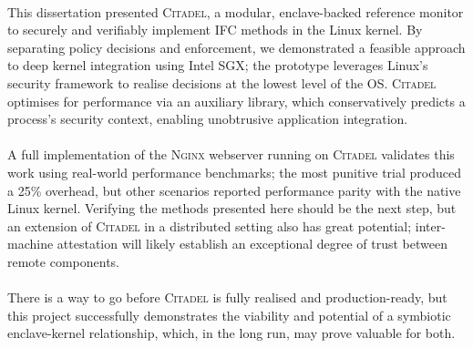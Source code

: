 \paragraph{} This dissertation presented \textsc{Citadel}, a modular, enclave-backed reference monitor to securely and verifiably implement IFC methods in the Linux kernel. By separating policy decisions and enforcement, we demonstrated a feasible approach to deep kernel integration using Intel SGX; the prototype leverages Linux's security framework to realise decisions at the lowest level of the OS. \textsc{Citadel} optimises for performance via an auxiliary library, which conservatively predicts a process's security context, enabling unobtrusive application integration.

\paragraph{} A full implementation of the \textsc{Nginx} webserver running on \textsc{Citadel} validates this work using real-world performance benchmarks; the most punitive trial produced a 25\% overhead, but other scenarios reported performance parity with the native Linux kernel. Verifying the methods presented here should be the next step, but an extension of \textsc{Citadel} in a distributed setting also has great potential; inter-machine attestation will likely establish an exceptional degree of trust between remote components.


\paragraph{} There is a way to go before \textsc{Citadel} is fully realised and production-ready, but this project successfully demonstrates the viability and potential of a symbiotic enclave-kernel relationship, which, in the long run, may prove valuable for both.